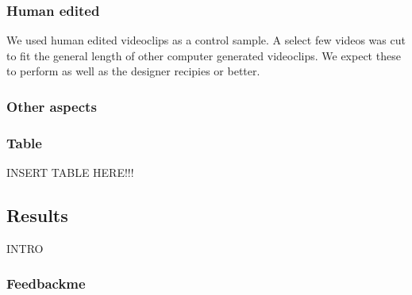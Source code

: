 \subsubsection{Human edited}
%
We used human edited videoclips as a control sample. A select few videos was cut to fit the general length of other computer generated videoclips. We expect these to perform as well as the designer recipies or better.
%
\subsubsection{Other aspects}
%
%
\subsubsection{Table}
%
INSERT TABLE HERE!!!
%
\subsection{Results}
%
INTRO
%
\subsubsection{Feedbackme}
%
%
